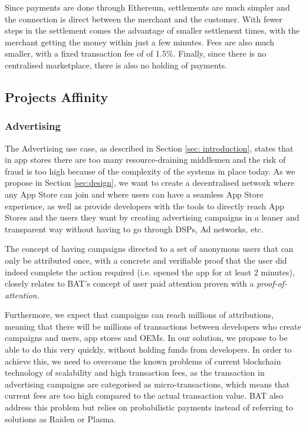 \medskip

Since payments are done through Ethereum, settlements are much simpler and the connection is direct between the merchant and the customer. With fewer steps in the settlement comes the advantage of smaller settlement times, with the merchant getting the money within just a few minutes. Fees are also much smaller, with a fixed transaction fee of of 1.5\%. Finally, since there is no centralised marketplace, there is also no holding of payments.

\subsection{Projects Affinity}

\subsubsection{Advertising}

The Advertising use case, as described in Section \ref{sec: introduction}, states that in app stores there are too many resource-draining middlemen and the risk of fraud is too high because of the complexity of the systems in place today. As we propose in Section \ref{sec:design}, we want to create a decentralised network where any App Store can join and where users can have a seamless App Store experience, as well as provide developers with the tools to directly reach App Stores and the users they want by creating advertising campaigns in a leaner and transparent way without having to go through DSPs, Ad networks, etc.

\medskip

The concept of having campaigns directed to a set of anonymous users that can only be attributed once, with a concrete and verifiable proof that the user did indeed complete the action required (i.e. opened the app for at least 2 minutes), closely relates to BAT's concept of user paid attention proven with a \textit{proof-of-attention}.

\medskip

Furthermore, we expect that campaigns can reach millions of attributions, meaning that there will be millions of transactions between developers who create campaigns and users, app stores and OEMs. In our solution, we propose to be able to do this very quickly, without holding funds from developers. In order to achieve this, we need to overcome the known problems of current blockchain technology of scalability and high transaction fees, as the transaction in advertising campaigns are categorised as micro-transactions, which means that current fees are too high compared to the actual transaction value. BAT also address this problem but relies on probabilistic payments \cite{MICROPAY1, MICROPAY2} instead of referring to solutions as Raiden or Plasma.

